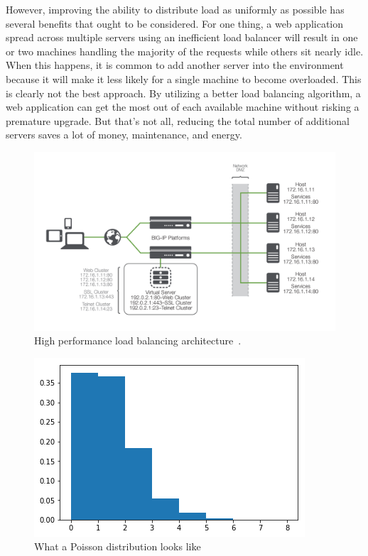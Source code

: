 However, improving the ability to distribute load as uniformly as
possible has several benefits that ought to be considered. For one
thing, a web application spread across multiple servers using an
inefficient load balancer will result in one or two machines handling
the majority of the requests while others sit nearly idle. When this
happens, it is common to add another server into the environment
because it will make it less likely for a single machine to become
overloaded. This is clearly not the best approach. By utilizing a
better load balancing algorithm, a web application can get the most
out of each available machine without risking a premature upgrade. But
that's not all, reducing the total number of additional servers saves
a lot of money, maintenance, and energy.

\begin{figure}
  \includegraphics[width=\linewidth]{figures/nutbolt.png}
  \caption{High performance load balancing architecture~\cite{nutbolt}.}
\label{fig:nutbolt}
\end{figure}

\begin{figure}
  \includegraphics[width=\linewidth]{figures/poisson.png}
  \caption{What a Poisson distribution looks like}
\label{fig:poisson}
\end{figure}

